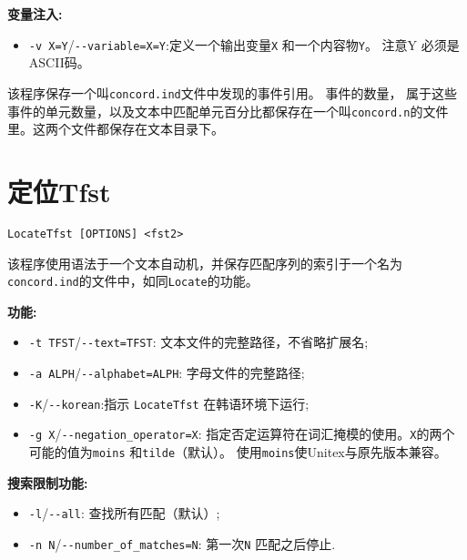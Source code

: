 \bigskip
\noindent \textbf{变量注入:}
\begin{itemize}
\item \verb+-v X=Y+/\verb+--variable=X=Y+:定义一个输出变量\verb+X+ 和一个内容物\verb+Y+。 
  注意Y 必须是ASCII码。
\end{itemize}

\bigskip
\noindent {} 该程序保存一个叫\verb+concord.ind+文件中发现的事件引用。
事件的数量， 属于这些事件的单元数量，以及文本中匹配单元百分比都保存在一个叫\verb+concord.n+的文件里。这两个文件都保存在文本目录下。







\section{定位Tfst}
\label{section-LocateTfst}
\verb+LocateTfst [OPTIONS] <fst2>+

\bigskip
\noindent {}
该程序使用语法于一个文本自动机，并保存匹配序列的索引于一个名为\verb+concord.ind+的文件中，如同\verb+Locate+的功能。

\bigskip
\noindent \textbf{功能:}
\begin{itemize}
  \item \verb+-t TFST+/\verb+--text=TFST+: 文本文件的完整路径，不省略扩展名;

  \item \verb+-a ALPH+/\verb+--alphabet=ALPH+: 字母文件的完整路径;
  
  \item \verb+-K+/\verb+--korean+:指示  \verb+LocateTfst+ 在韩语环境下运行;

  \item \verb+-g X+/\verb+--negation_operator=X+: 
  指定否定运算符在词汇掩模的使用。\verb+X+的两个可能的值为\verb+moins+ 和\verb+tilde+（默认）。
  使用\verb+moins+使Unitex与原先版本兼容。
  
\end{itemize}

\bigskip
\noindent \textbf{搜索限制功能:}
\begin{itemize}
  \item \verb+-l+/\verb+--all+: 查找所有匹配（默认）;
  \item \verb+-n N+/\verb+--number_of_matches=N+: 第一次\verb+N+ 匹配之后停止.
\end{itemize}

